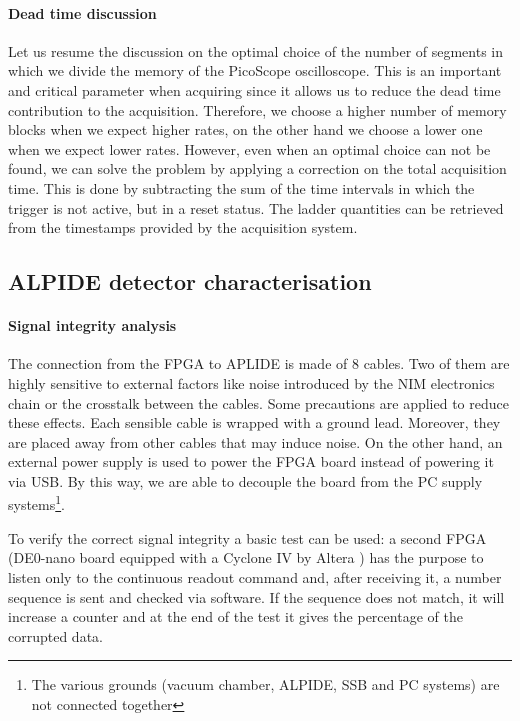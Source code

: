 \documentclass[../../main/main.tex]{subfiles}
\begin{document}
\paragraph{Dead time discussion}
Let us resume the discussion on the optimal choice of the number of segments in which we divide the memory of the PicoScope oscilloscope. This is an important and critical parameter when acquiring since it allows us to reduce the dead time contribution to the acquisition. Therefore, we choose a higher number of memory blocks when we expect higher rates, on the other hand we choose a lower one when we expect lower rates. However, even when an optimal choice can not be found, we can solve the problem by applying a correction on the total acquisition time. This is done by subtracting the sum of the time intervals in which the trigger is not active, but in a reset status. The ladder quantities can be retrieved from the timestamps provided by the acquisition system.



\subsection{ALPIDE detector characterisation}

\paragraph{Signal integrity analysis} The connection from the FPGA to APLIDE is made of 8 cables. Two of them are highly sensitive to external factors like noise introduced by the NIM electronics chain or the crosstalk between the cables.
Some precautions are applied to reduce these effects. Each sensible cable is wrapped with a ground lead. Moreover, they are placed away from other cables that may induce noise. On the other hand, an external power supply is used to power the FPGA board instead of powering it via USB. By this way, we are able to decouple the board from the PC supply systems\footnote{The various grounds (vacuum chamber, ALPIDE, SSB and PC systems) are not connected together}.

To verify the correct signal integrity a basic test can be used: a second FPGA (DE0-nano board equipped with a Cyclone IV by Altera \cite{DE0}) has the purpose to listen only to the continuous readout command and, after receiving it, a number sequence is sent and checked via software. If the sequence does not match, it will increase a counter and at the end of the test it gives the percentage of the corrupted data.
\end{document}
